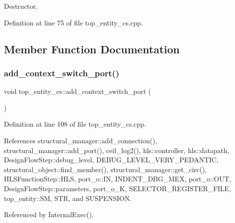 Destructor. 



Definition at line 75 of file top\+\_\+entity\+\_\+cs.\+cpp.



\subsection{Member Function Documentation}
\mbox{\label{classtop__entity__cs_a4c457699245092dbe20fe8f2cb1e223d}} 
\subsubsection{\texorpdfstring{add\+\_\+context\+\_\+switch\+\_\+port()}{add\_context\_switch\_port()}}
{\footnotesize\ttfamily void top\+\_\+entity\+\_\+cs\+::add\+\_\+context\+\_\+switch\+\_\+port (\begin{DoxyParamCaption}{ }\end{DoxyParamCaption})\hspace{0.3cm}{\ttfamily [protected]}}



Definition at line 108 of file top\+\_\+entity\+\_\+cs.\+cpp.



References structural\+\_\+manager\+::add\+\_\+connection(), structural\+\_\+manager\+::add\+\_\+port(), ceil\+\_\+log2(), hls\+::controller, hls\+::datapath, Design\+Flow\+Step\+::debug\+\_\+level, D\+E\+B\+U\+G\+\_\+\+L\+E\+V\+E\+L\+\_\+\+V\+E\+R\+Y\+\_\+\+P\+E\+D\+A\+N\+T\+IC, structural\+\_\+object\+::find\+\_\+member(), structural\+\_\+manager\+::get\+\_\+circ(), H\+L\+S\+Function\+Step\+::\+H\+LS, port\+\_\+o\+::\+IN, I\+N\+D\+E\+N\+T\+\_\+\+D\+B\+G\+\_\+\+M\+EX, port\+\_\+o\+::\+O\+UT, Design\+Flow\+Step\+::parameters, port\+\_\+o\+\_\+K, S\+E\+L\+E\+C\+T\+O\+R\+\_\+\+R\+E\+G\+I\+S\+T\+E\+R\+\_\+\+F\+I\+LE, top\+\_\+entity\+::\+SM, S\+TR, and S\+U\+S\+P\+E\+N\+S\+I\+ON.



Referenced by Internal\+Exec().

